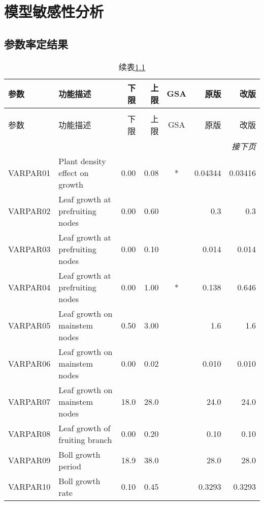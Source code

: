 \chapter{模型敏感性分析}

\section{参数率定结果}

\begin{longtable}{llrrcrr}
    \caption{Cotton2K 参数列表及率定值}
    \label{tab:parameters}                                                                  \\
    \toprule
    参数     & 功能描述                         & 下限   & 上限   & GSA & 原版    & 改版    \\
    \midrule\endfirsthead
    \caption*{续表\ref{tab:parameters}}                                                     \\
    \toprule
    参数     & 功能描述                         & 下限   & 上限   & GSA & 原版    & 改版    \\
    \midrule
    \endhead
    \bottomrule
    \multicolumn{7}{r}{\textit{接下页}}                                                     \\
    \endfoot
    \bottomrule
    \endlastfoot
    VARPAR01 & Plant density effect on growth   & 0.00   & 0.08   & *   & 0.04344 & 0.03416 \\
    VARPAR02 & Leaf growth at prefruiting nodes & 0.00   & 0.60   &     & 0.3     & 0.3     \\
    VARPAR03 & Leaf growth at prefruiting nodes & 0.00   & 0.10   &     & 0.014   & 0.014   \\
    VARPAR04 & Leaf growth at prefruiting nodes & 0.00   & 1.00   & *   & 0.138   & 0.646   \\
    VARPAR05 & Leaf growth on mainstem nodes    & 0.50   & 3.00   &     & 1.6     & 1.6     \\
    VARPAR06 & Leaf growth on mainstem nodes    & 0.00   & 0.02   &     & 0.010   & 0.010   \\
    VARPAR07 & Leaf growth on mainstem nodes    & 18.0   & 28.0   &     & 24.0    & 24.0    \\
    VARPAR08 & Leaf growth of fruiting branch   & 0.00   & 0.20   &     & 0.10    & 0.10    \\
    VARPAR09 & Boll growth period               & 18.9   & 38.0   &     & 28.0    & 28.0    \\
    VARPAR10 & Boll growth rate                 & 0.10   & 0.45   &     & 0.3293  & 0.3293  \\

\end{longtable}
